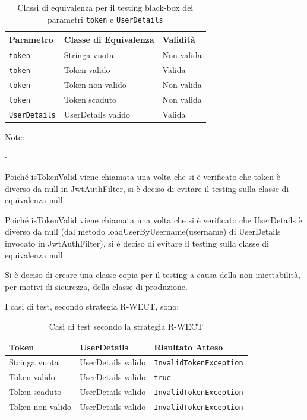 \begin{table}[h!]
    \centering
    \renewcommand{\arraystretch}{1.4}
    \begin{tabularx}{\textwidth}{|X|X|X|}
    \hline
    \textbf{Parametro} & \textbf{Classe di Equivalenza} & \textbf{Validità} \\
    \hline
    \texttt{token} & Stringa vuota & Non valida \\
    \hline
    \texttt{token} & Token valido & Valida \\
    \hline
    \texttt{token} & Token non valido & Non valida \\
    \hline
    \texttt{token} & Token scaduto & Non valida \\
    \hline
    \texttt{UserDetails} & UserDetails valido & Valida \\
    \hline
    \end{tabularx}
    \caption{Classi di equivalenza per il testing black-box dei parametri \texttt{token} e \texttt{UserDetails}}
\end{table}

Note: 
\begin{list}{$\cdot$}{}
    \item Poiché isTokenValid viene chiamata una volta che si è 
    verificato che token è diverso da null in JwtAuthFilter, si 
    è deciso di evitare il testing sulla classe di equivalenza 
    null.
    \item Poiché isTokenValid viene chiamata una volta che si è 
    verificato che UserDetails è diverso da null (dal metodo 
    loadUserByUsername(username) di UserDetails invocato in 
    JwtAuthFilter), si è deciso di evitare il testing sulla 
    classe di equivalenza null.
    \item Si è deciso di creare una classe copia per il testing 
    a causa della non iniettabilità, per motivi di sicurezza, 
    della classe di produzione.
\end{list}

\noindent
I casi di test, secondo strategia R-WECT, sono:
\begin{table}[h!]
    \centering
    \renewcommand{\arraystretch}{1.4}
    \begin{tabularx}{\textwidth}{|X|X|X|}
    \hline
    \textbf{Token} & \textbf{UserDetails} & \textbf{Risultato Atteso} \\
    \hline
    Stringa vuota & UserDetails valido & \texttt{InvalidTokenException} \\
    \hline
    Token valido & UserDetails valido & \texttt{true} \\
    \hline
    Token scaduto & UserDetails valido & \texttt{InvalidTokenException} \\
    \hline
    Token non valido & UserDetails valido & \texttt{InvalidTokenException} \\
    \hline
    \end{tabularx}
    \caption{Casi di test secondo la strategia R-WECT}
\end{table}

